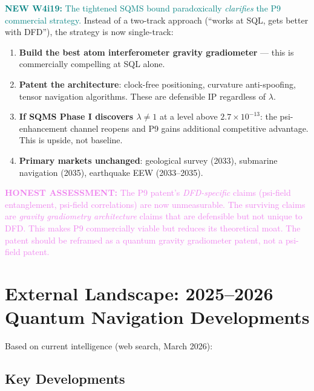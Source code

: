 \documentclass[11pt]{article}
\theoremstyle{definition}
\theoremstyle{remark}
\newcommand{\ee}[1]{\times10^{#1}}
\newcommand{\honest}[1]{\textcolor{violet}{\textbf{HONEST ASSESSMENT:} #1}}
\newcommand{\newfinding}[1]{\textcolor{teal}{\textbf{NEW W4i19:} #1}}
\begin{document}
\newfinding{The tightened SQMS bound paradoxically \emph{clarifies} the
P9 commercial strategy.} Instead of a two-track approach (``works at SQL,
gets better with DFD''), the strategy is now single-track:

\begin{enumerate}
  \item \textbf{Build the best atom interferometer gravity gradiometer} ---
    this is commercially compelling at SQL alone.
  \item \textbf{Patent the architecture}: clock-free positioning, curvature
    anti-spoofing, tensor navigation algorithms. These are defensible IP
    regardless of $\lambda$.
  \item \textbf{If SQMS Phase I discovers $\lambda \neq 1$} at a level above
    $2.7\ee{-13}$: the psi-enhancement channel reopens and P9 gains
    additional competitive advantage. This is upside, not baseline.
  \item \textbf{Primary markets unchanged}: geological survey (2033), submarine
    navigation (2035), earthquake EEW (2033--2035).
\end{enumerate}

\honest{The P9 patent's \emph{DFD-specific} claims (psi-field entanglement,
psi-field correlations) are now unmeasurable. The surviving claims are
\emph{gravity gradiometry architecture} claims that are defensible but
not unique to DFD. This makes P9 commercially viable but reduces its
theoretical moat. The patent should be reframed as a quantum gravity
gradiometer patent, not a psi-field patent.}

\section{External Landscape: 2025--2026 Quantum Navigation Developments}
\label{sec:external}

Based on current intelligence (web search, March 2026):

\subsection{Key Developments}
\end{document}
